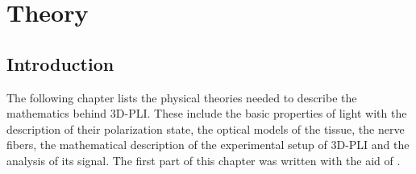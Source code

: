 \setcounter{chapter}{2}
\chapter{Theory}
\label{sec:theory}
%
%
\section{Introduction}
The following chapter lists the physical theories needed to describe the mathematics behind \ac{3D-PLI}.
These include the basic properties of light with the description of their polarization state, the optical models of the tissue, \ie{} the nerve fibers, the mathematical description of the experimental setup of \ac{3D-PLI} and the analysis of its signal.
The first part of this chapter was written with the aid of \cite{demtroeder2, Fliebach2012}.
%
%
%

